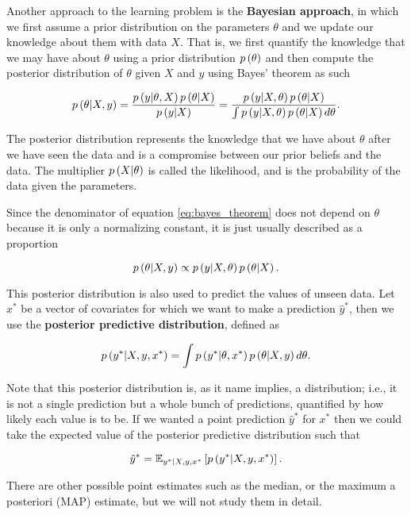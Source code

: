 Another approach to the learning problem is the \textbf{Bayesian approach}, in which we first assume a prior distribution on the parameters $\theta$ and we update our knowledge about them with data $X$. That is, we first quantify the knowledge that we may have about $\theta$ using a prior distribution $p\left( \theta \right)$ and then compute the posterior distribution of $\theta$ given $X$ and $y$ using Bayes' theorem as such

\begin{equation}
  \label{eq:bayes_theorem}
  p\left( \theta | X, y \right) = \frac{p\left( y | \theta, X \right) p\left( \theta | X \right)}{p\left( y | X \right)} = \frac{p\left( y | X, \theta \right) p\left( \theta | X \right)}{\int p\left( y | X, \theta \right) p\left( \theta | X \right) d\theta}.
\end{equation}

The posterior distribution represents the knowledge that we have about $\theta$ after we have seen the data and is a compromise between our prior beliefs and the data. The multiplier $p\left( X | \theta \right)$ is called the likelihood, and is the probability of the data given the parameters.

Since the denominator of equation \ref{eq:bayes_theorem} does not depend on $\theta$ because it is only a normalizing constant, it is just usually described as a proportion

\begin{equation}
  \label{eq:bayes_theorem_prop}
    p\left( \theta | X, y \right) \propto p\left( y | X, \theta \right) p\left( \theta | X \right).
\end{equation}

This posterior distribution is also used to predict the values of unseen data. Let $x^*$ be a vector of covariates for which we want to make a prediction $\hat{y}^*$, then we use the \textbf{posterior predictive distribution}, defined as

$$
  p\left( y^* | X, y, x^* \right) = \int p\left( y^* | \theta, x^* \right) p\left( \theta | X, y \right) d\theta.
$$

Note that this posterior distribution is, as it name implies, a distribution; i.e., it is not a single prediction but a whole bunch of predictions, quantified by how likely each value is to be. If we wanted a point prediction $\hat{y}^*$ for $x^*$ then we could take the expected value of the posterior predictive distribution such that

$$
  \hat{y}^* = \mathbb{E}_{y^* | X, y, x^*} \left[ p\left( y^* | X, y, x^* \right) \right].
$$

There are other possible point estimates such as the median, or the maximum a posteriori (MAP) estimate, but we will not study them in detail.


